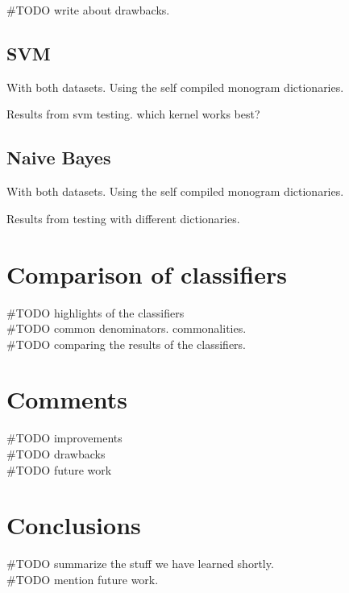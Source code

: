 #TODO write about drawbacks. 

\subsection{SVM}
With both datasets.
Using the self compiled monogram dictionaries. 

Results from svm testing. which kernel works best?

\subsection{Naive Bayes}
With both datasets.
Using the self compiled monogram dictionaries. 

Results from testing with different dictionaries. 

\section{Comparison of classifiers}
#TODO highlights of the classifiers \\
#TODO common denominators. commonalities.\\
#TODO comparing the results of the classifiers. \\

\section{Comments}
#TODO improvements \\
#TODO drawbacks \\
#TODO future work \\

\section{Conclusions}
#TODO summarize the stuff we have learned shortly. \\
#TODO mention future work. \\

